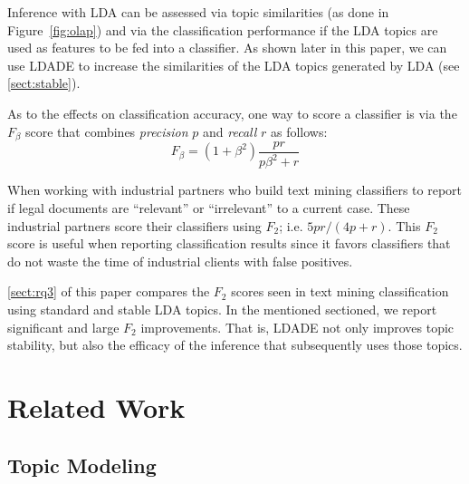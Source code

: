 \documentclass[twocolumn,5p,sort&compress]{elsarticle}
\newcommand{\tion}[1]{\ref{sect:#1}}
\newcommand{\fig}[1]{Figure~\ref{fig:#1}}
\theoremstyle{break}
\begin{document}
Inference with LDA can be assessed via topic similarities (as done in \fig{olap}) and via the classification performance if the LDA topics are used as features to be fed into a classifier. As shown later in this paper, we can use LDADE to increase the similarities of the LDA
topics generated by LDA (see \tion{stable}).

As to the effects on classification accuracy, 
one way to score a classifier is via the $F_\beta$ score that combines
{\em precision} $p$ and {\em recall} $r$ as follows:
\begin{equation}\label{eq:f}
F_{\beta} = (1+\beta^2) \frac{pr}{p\beta^2 + r}
\end{equation}

When working with industrial partners who build
text mining
 classifiers to report if legal documents are
``relevant'' or ``irrelevant'' to a current case.
These industrial partners score their classifiers using   $F_2$; i.e.
\mbox{$5pr/(4p + r)$}. This $F_2$ score is useful when reporting classification results
since it favors classifiers that do not waste the time of industrial clients with false positives.

\tion{rq3} of this paper compares the $F_2$ scores seen in text mining classification using standard and stable LDA topics.
In the mentioned sectioned, we report 
significant and large
$F_2$ improvements. That is, LDADE not only improves topic stability, but also the efficacy
of the inference that subsequently uses those topics.
\section{Related Work}
\label{sect:related}

\subsection{Topic Modeling}\label{sect:tm}
\end{document}
